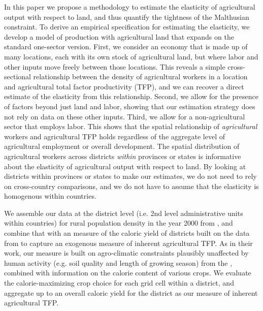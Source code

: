 \documentclass[11pt]{article}
\begin{document}
In this paper we propose a methodology to estimate the elasticity of agricultural output with respect to land, and thus quantify the tightness of the Malthusian constraint. To derive an empirical specification for estimating the elasticity, we develop a model of production with agricultural land that expands on the standard one-sector version. First, we consider an economy that is made up of many locations, each with its own stock of agricultural land, but where labor and other inputs move freely between those locations. This reveals a simple cross-sectional relationship between the density of agricultural workers in a location and agricultural total factor productivity (TFP), and we can recover a direct estimate of the elasticity from this relationship. Second, we allow for the presence of factors beyond just land and labor, showing that our estimation strategy does not rely on data on these other inputs. Third, we allow for a non-agricultural sector that employs labor. This shows that the spatial relationship of \textit{agricultural} workers and agricultural TFP holds regardless of the aggregate level of agricultural employment or overall development. The spatial distribution of agricultural workers across districts \textit{within} provinces or states is informative about the elasticity of agricultural output with respect to land. By looking at districts within provinces or states to make our estimates, we do not need to rely on cross-country comparisons, and we do not have to assume that the elasticity is homogenous within countries.

We assemble our data at the district level (i.e. 2nd level administrative units within countries) for rural population density in the year 2000 from \citet{hyde31}, and combine that with an measure of the caloric yield of districts built on the data from \citet{galorozak2016} to capture an exogenous measure of inherent agricultural TFP. As in their work, our measure is built on agro-climatic constraints plausibly unaffected by human activity (e.g. soil quality and length of growing season) from the \citet{gaez}, combined with information on the calorie content of various crops. We evaluate the calorie-maximizing crop choice for each grid cell within a district, and aggregate up to an overall caloric yield for the district as our measure of inherent agricultural TFP.
\end{document}
